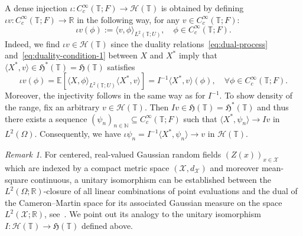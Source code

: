 \documentclass[reqno]{amsart}
\numberwithin{equation}{section}
\newcommand{\bbR}{\mathbb{R}}
\newcommand{\bbT}{\mathbb{T}}
\newcommand{\R}{\mathbb{R}}
\newcommand{\N}{\mathbb{N}}
\newcommand{\E}{\mathbb{E}}
\newcommand{\cH}{\mathcal{H}}
\newcommand{\cX}{\mathcal{X}}
\newcommand{\scalar}[2]{     \langle #1       \rangle_{ #2 }}
\newcommand{\from}{\colon}
\theoremstyle{remark}
\newtheorem{remark}[lemma]{Remark}
\theoremstyle{definition}
\begin{document}
A dense injection $\iota \from C_c^\infty(\bbT; F) \to \cH(\bbT)$  is obtained
by defining ${\iota v \from C_c^\infty(\bbT; F) \to \R}$ in the following way,
for any $v \in C_c^\infty(\bbT; F)$:
%
\[
\iota v(\phi)
:=
\scalar{v, \phi}{L^2(\bbT; U)},
\quad 
\phi \in C_c^\infty(\bbT; F).
\]
%
Indeed, we find $\iota v \in \cH(\bbT)$ 
since the duality relations~\eqref{eq:dual-process} and~\eqref{eq:duality-condition-1}
between $X$ and $X^*$
imply that
$\langle X^*, v \rangle \in \mathfrak H^*(\bbT) = \mathfrak H(\bbT)$
satisfies
%
\[
\iota v(\phi)
=
\E[\scalar{X, \phi}{L^2(\bbT; U)} \langle X^*, v \rangle]
=
I^{-1} \langle X^*, v \rangle(\phi),
\quad 
\forall \phi \in C_c^\infty(\bbT; F).
\]
%
Moreover, the injectivity follows in the same way as for $I^{-1}$.
To show density of the range, fix an arbitrary $v \in \cH(\bbT)$.
Then ${I v \in \mathfrak H(\bbT) = \mathfrak H^*(\bbT)}$ and thus
there exists a sequence
$(\psi_n)_{n\in\N} \subseteq C_c^\infty(\bbT; F)$
such that $\langle X^*, \psi_n \rangle \to Iv$ in $L^2(\Omega)$.
Consequently,
we have $\iota \psi_n = I^{-1} \langle X^*, \psi_n \rangle \to v$ in $\cH(\bbT)$.

\begin{remark}
	For centered, real-valued Gaussian random fields $(Z(x))_{x \in \cX}$
	which are indexed by a compact metric space $(\cX, d_{\cX})$ and moreover mean-square continuous,
	a unitary isomorphism can be established between the $L^2(\Omega;\bbR)$-closure
	of all linear combinations of point evaluations
	and the dual of the Cameron--Martin space for its associated Gaussian measure on 
	the space $L^2(\cX; \bbR)$, see~\cite[Lemma~4.1(iii)]{KB2022}.
	We point out its analogy to
	the unitary isomorphism
	$I \from \cH(\bbT) \to \mathfrak H(\bbT)$ defined above.
\end{remark}
\end{document}
